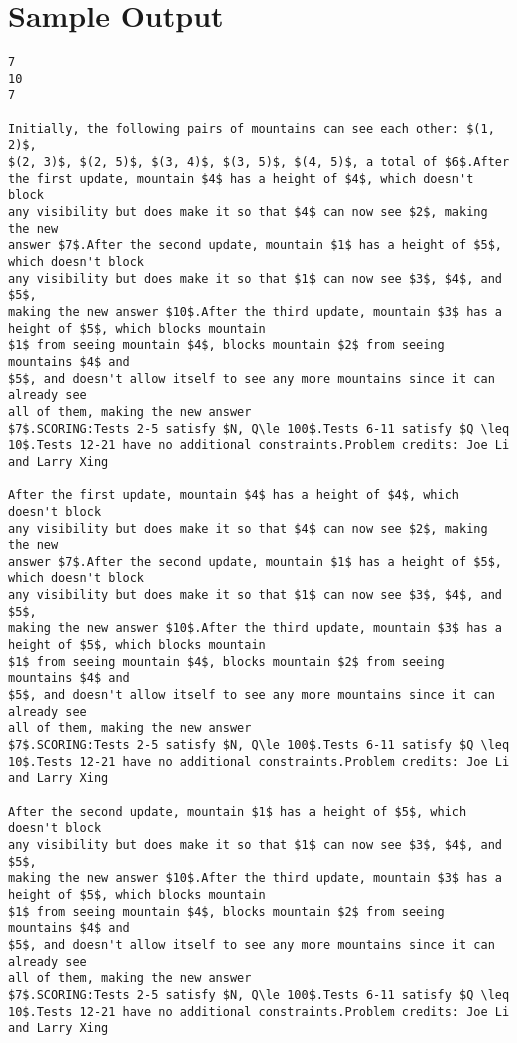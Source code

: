 \documentclass[12pt]{article}
\begin{document}
\section*{Sample Output}
\begin{verbatim}
7
10
7

Initially, the following pairs of mountains can see each other: $(1, 2)$,
$(2, 3)$, $(2, 5)$, $(3, 4)$, $(3, 5)$, $(4, 5)$, a total of $6$.After the first update, mountain $4$ has a height of $4$, which doesn't block
any visibility but does make it so that $4$ can now see $2$, making the new
answer $7$.After the second update, mountain $1$ has a height of $5$, which doesn't block
any visibility but does make it so that $1$ can now see $3$, $4$, and $5$,
making the new answer $10$.After the third update, mountain $3$ has a height of $5$, which blocks mountain
$1$ from seeing mountain $4$, blocks mountain $2$ from seeing mountains $4$ and
$5$, and doesn't allow itself to see any more mountains since it can already see
all of them, making the new answer
$7$.SCORING:Tests 2-5 satisfy $N, Q\le 100$.Tests 6-11 satisfy $Q \leq 10$.Tests 12-21 have no additional constraints.Problem credits: Joe Li and Larry Xing

After the first update, mountain $4$ has a height of $4$, which doesn't block
any visibility but does make it so that $4$ can now see $2$, making the new
answer $7$.After the second update, mountain $1$ has a height of $5$, which doesn't block
any visibility but does make it so that $1$ can now see $3$, $4$, and $5$,
making the new answer $10$.After the third update, mountain $3$ has a height of $5$, which blocks mountain
$1$ from seeing mountain $4$, blocks mountain $2$ from seeing mountains $4$ and
$5$, and doesn't allow itself to see any more mountains since it can already see
all of them, making the new answer
$7$.SCORING:Tests 2-5 satisfy $N, Q\le 100$.Tests 6-11 satisfy $Q \leq 10$.Tests 12-21 have no additional constraints.Problem credits: Joe Li and Larry Xing

After the second update, mountain $1$ has a height of $5$, which doesn't block
any visibility but does make it so that $1$ can now see $3$, $4$, and $5$,
making the new answer $10$.After the third update, mountain $3$ has a height of $5$, which blocks mountain
$1$ from seeing mountain $4$, blocks mountain $2$ from seeing mountains $4$ and
$5$, and doesn't allow itself to see any more mountains since it can already see
all of them, making the new answer
$7$.SCORING:Tests 2-5 satisfy $N, Q\le 100$.Tests 6-11 satisfy $Q \leq 10$.Tests 12-21 have no additional constraints.Problem credits: Joe Li and Larry Xing


\end{verbatim}
\end{document}
